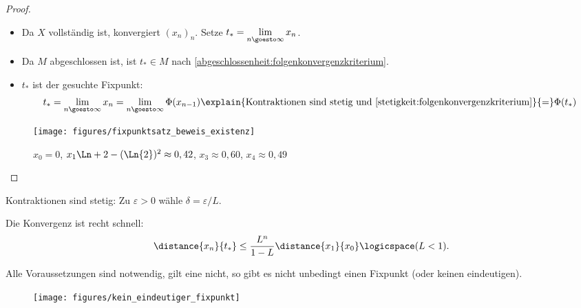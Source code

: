\begin{proof}
\begin{proofdescription}
\begin{subproof}
\begin{itemize}
                \item Da \( X\) vollständig ist, konvergiert \( (x_n)_n\). Setze \( t_*=\lim\limits_{n \goesto \infty} x_n\).
                \item Da \( M\) abgeschlossen ist, ist \( t_*\in M\) nach \ref{abgeschlossenheit:folgenkonvergenzkriterium}.
                \item \( t_*\) ist der gesuchte Fixpunkt:
                \begin{align*}
                    t_*=\lim\limits_{n \goesto \infty} x_n=\lim\limits_{n \goesto \infty} \Phi(x_{n-1})\explain{\text{Kontraktionen sind stetig und \ref{stetigkeit:folgenkonvergenzkriterium}}}{=}\Phi(t_*)
                \end{align*} 
            \end{itemize}
        \begin{figure}[H]
            \centering
            \texttt{[image: figures/fixpunktsatz\_beweis\_existenz]}
            \caption*{\( x_0=0\), \( x_1\Ln+{2-(\Ln{2})^2}\approx 0,42\), \( x_3\approx 0,60\), \( x_4\approx 0,49\)}
            \label{fig:fixpunktsatz_beweis_existenz}
        \end{figure}
        
        \end{subproof}
        
           
    \end{proofdescription}
    
    
\end{proof}
\begin{bemerkung*}
    Kontraktionen sind stetig: Zu \( \varepsilon>0\) wähle \( \delta=\varepsilon/L\).
\end{bemerkung*}
\begin{bemerkung*}
    Die Konvergenz ist recht schnell:
    \begin{align*}
        \distance{x_n}{t_*}\leq \frac{L^n}{1-L}\distance{x_1}{x_0}\logicspace (L<1).
    \end{align*}
\end{bemerkung*}

Alle Voraussetzungen sind notwendig, gilt eine nicht, so gibt es nicht unbedingt einen Fixpunkt (oder keinen eindeutigen).
\begin{figure}[H]
    \centering
    \texttt{[image: figures/kein\_eindeutiger\_fixpunkt]}
    \label{fig:kein_eindeutiger_fixpunkt}
\end{figure}



